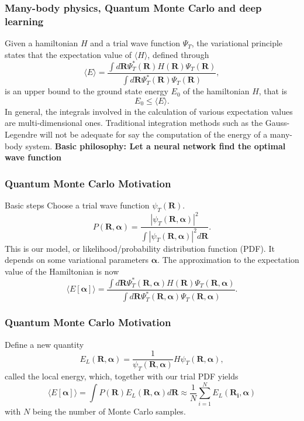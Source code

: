 \documentclass{beamer}
\begin{document}
\begin{frame}
\frametitle{Many-body physics, Quantum Monte Carlo and deep learning}

\begin{block}{}
Given a hamiltonian $H$ and a trial wave function $\Psi_T$, the variational principle states that the expectation value of $\langle H \rangle$, defined through 
\[
   \langle E \rangle =
   \frac{\int d\bm{R}\Psi^{\ast}_T(\bm{R})H(\bm{R})\Psi_T(\bm{R})}
        {\int d\bm{R}\Psi^{\ast}_T(\bm{R})\Psi_T(\bm{R})},
\]
is an upper bound to the ground state energy $E_0$ of the hamiltonian $H$, that is 
\[
    E_0 \le \langle E \rangle.
\]
In general, the integrals involved in the calculation of various  expectation values  are multi-dimensional ones. Traditional integration methods such as the Gauss-Legendre will not be adequate for say the  computation of the energy of a many-body system.  \textbf{Basic philosophy: Let a neural network find the optimal wave function}
\end{block}
\end{frame}

\begin{frame}
\frametitle{Quantum Monte Carlo Motivation}

\begin{block}{Basic steps }
Choose a trial wave function
$\psi_T(\bm{R})$.
\[
   P(\bm{R},\bm{\alpha})= \frac{\left|\psi_T(\bm{R},\bm{\alpha})\right|^2}{\int \left|\psi_T(\bm{R},\bm{\alpha})\right|^2d\bm{R}}.
\]
This is our model, or likelihood/probability distribution function  (PDF). It depends on some variational parameters $\bm{\alpha}$.
The approximation to the expectation value of the Hamiltonian is now 
\[
   \langle E[\bm{\alpha}] \rangle = 
   \frac{\int d\bm{R}\Psi^{\ast}_T(\bm{R},\bm{\alpha})H(\bm{R})\Psi_T(\bm{R},\bm{\alpha})}
        {\int d\bm{R}\Psi^{\ast}_T(\bm{R},\bm{\alpha})\Psi_T(\bm{R},\bm{\alpha})}.
\]
\end{block}
\end{frame}

\begin{frame}
\frametitle{Quantum Monte Carlo Motivation}

\begin{block}{Define a new quantity }
\[
   E_L(\bm{R},\bm{\alpha})=\frac{1}{\psi_T(\bm{R},\bm{\alpha})}H\psi_T(\bm{R},\bm{\alpha}),
\]
called the local energy, which, together with our trial PDF yields
\[
  \langle E[\bm{\alpha}] \rangle=\int P(\bm{R})E_L(\bm{R},\bm{\alpha}) d\bm{R}\approx \frac{1}{N}\sum_{i=1}^NE_L(\bm{R_i},\bm{\alpha})
\]
with $N$ being the number of Monte Carlo samples.
\end{block}
\end{frame}
\end{document}
